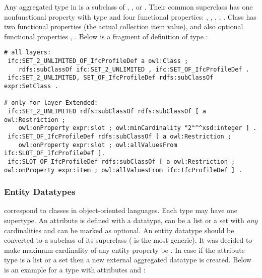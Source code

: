 Any aggregated type in \ifcowl{} is a subclass of ,
,  or . Their common superclass  has one nonfunctional property  with type  and four functional properties: , , , , . Class  has two functional properties  (the actual collection item value),  and also optional functional properties , . Below is a fragment of definition of type :

\begin{lstlisting}
# all layers:
 ifc:SET_2_UNLIMITED_OF_IfcProfileDef a owl:Class ;
    rdfs:subClassOf ifc:SET_2_UNLIMITED , ifc:SET_OF_IfcProfileDef .
 ifc:SET_2_UNLIMITED, SET_OF_IfcProfileDef rdfs:subClassOf expr:SetClass .

# only for layer Extended:
 ifc:SET_2_UNLIMITED rdfs:subClassOf rdfs:subClassOf [ a owl:Restriction ;
    owl:onProperty expr:slot ; owl:minCardinality "2"^^xsd:integer ] .
 ifc:SET_OF_IfcProfileDef rdfs:subClassOf [ a owl:Restriction ;
    owl:onProperty expr:slot ; owl:allValuesFrom ifc:SLOT_OF_IfcProfileDef ].
 ifc:SLOT_OF_IfcProfileDef rdfs:subClassOf [ a owl:Restriction ; owl:onProperty expr:item ; owl:allValuesFrom ifc:IfcProfileDef ] .
\end{lstlisting}




\subsubsection{Entity Datatypes} correspond to classes in object-oriented languages. Each type may have one super\-type. An attribute is defined with a data\-type, can be a list or a set with \emph{any} cardinalities and can be marked as optional. An entity data\-type should be converted to a subclass of its super\-class ( is the most generic). It was decided to make maximum cardinality of any entity property be . In case if the attribute type is a list or a set then a new external aggregated data\-type is created. Below is an example for a type with attributes  and :

